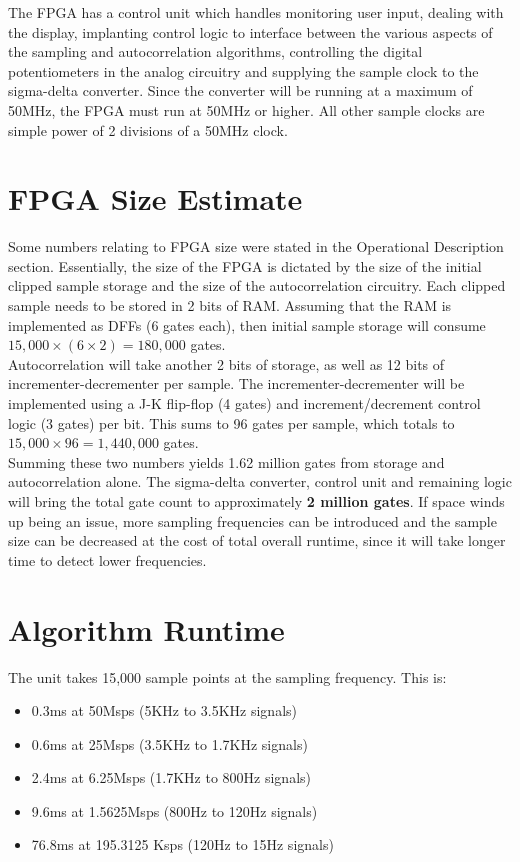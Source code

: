 \documentclass[aps,letterpaper,10pt]{revtex4}
\begin{document}
The FPGA has a control unit which handles monitoring user input, dealing with the display, implanting control logic to interface between the various aspects of the sampling and autocorrelation algorithms, controlling the digital potentiometers in the analog circuitry and supplying the sample clock to the sigma-delta converter. Since the converter will be running at a maximum of 50MHz, the FPGA must run at 50MHz or higher. All other sample clocks are simple power of 2 divisions of a 50MHz clock.\\

\section{FPGA Size Estimate}
Some numbers relating to FPGA size were stated in the Operational Description section. Essentially, the size of the FPGA is dictated by the size of the initial clipped sample storage and the size of the autocorrelation circuitry. Each clipped sample needs to be stored in 2 bits of RAM. Assuming that the RAM is implemented as DFFs (6 gates each), then initial sample storage will consume $15,000\times(6 \times 2) = 180,000$ gates.\\

Autocorrelation will take another 2 bits of storage, as well as 12 bits of incrementer-decrementer per sample. The incrementer-decrementer will be implemented using a J-K flip-flop (4 gates) and increment/decrement control logic (3 gates) per bit. This sums to 96 gates per sample, which totals to $15,000\times96 = 1,440,000$ gates.\\

Summing these two numbers yields 1.62 million gates from storage and autocorrelation alone. The sigma-delta converter, control unit and remaining logic will bring the total gate count to approximately \textbf{2 million gates}. If space winds up being an issue, more sampling frequencies can be introduced and the sample size can be decreased at the cost of total overall runtime, since it will take longer time to detect lower frequencies. 

\section{Algorithm Runtime}
The unit takes 15,000 sample points at the sampling frequency. This is:
\begin{itemize}
\item 0.3ms at 50Msps (5KHz to 3.5KHz signals)
\item 0.6ms at 25Msps (3.5KHz to 1.7KHz signals)
\item 2.4ms at 6.25Msps (1.7KHz to 800Hz signals)
\item 9.6ms at 1.5625Msps (800Hz to 120Hz signals)
\item 76.8ms at 195.3125 Ksps (120Hz to 15Hz signals)
\end{itemize}
\end{document}
